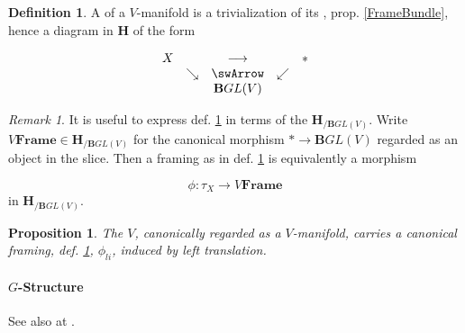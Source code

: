 \documentclass[12pt,titlepage]{article}
\newcommand{\itexarray}[1]{\begin{matrix}#1\end{matrix}}
\theoremstyle{plain}
\newtheorem{prop}{Proposition}
\theoremstyle{definition}
\newtheorem{defn}{Definition}
\theoremstyle{remark}
\newtheorem{remark}{Remark}
\begin{document}
\begin{defn}
\label{Framing}\hypertarget{Framing}{}
A  of a $V$-manifold is a trivialization of its , prop. \ref{FrameBundle}, hence a diagram in $\mathbf{H}$ of the form

\begin{displaymath}
\itexarray{
    X && \longrightarrow && \ast
    \\
    & \searrow &\swArrow& \swarrow
    \\
    && \mathbf{B}GL(V)
  }
\end{displaymath}
\end{defn}
\begin{remark}
\label{ModuliForFramings}\hypertarget{ModuliForFramings}{}
It is useful to express def. \ref{Framing} in terms of the  $\mathbf{H}_{/\mathbf{B}GL(V)}$. Write $V\mathbf{Frame}\in \mathbf{H}_{/\mathbf{B}GL(V)}$ for the canonical morphism $\ast \to \mathbf{B}GL(V)$ regarded as an object in the slice. Then a framing as in def. \ref{Framing} is equivalently a morphism

\begin{displaymath}
\phi \colon \tau_X \longrightarrow V\mathbf{Frame}
\end{displaymath}
in $\mathbf{H}_{/\mathbf{B}GL(V)}$.

\end{remark}
\begin{prop}
\label{LeftTranslationFraming}\hypertarget{LeftTranslationFraming}{}
The  $V$, canonically regarded as a $V$-manifold, carries a canonical framing, def. \ref{Framing}, $\phi_{li}$, induced by left translation.

\end{prop}
\hypertarget{GStructure}{}\paragraph*{{$G$-Structure}}\label{GStructure}

See also at \emph{}.
\end{document}
